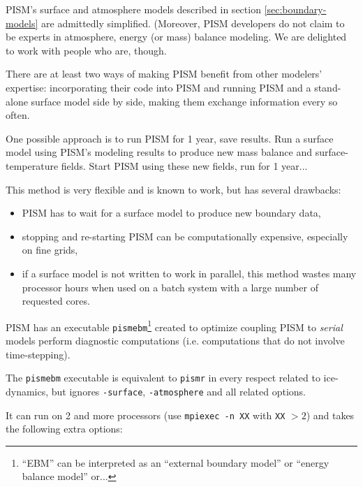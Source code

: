 PISM's surface and atmosphere models described in section
\ref{sec:boundary-models} are admittedly simplified. (Moreover, PISM developers
do not claim to be experts in atmosphere, energy (or mass) balance modeling. We
are delighted to work with people who are, though.

There are at least two ways of making PISM benefit from other modelers'
expertise: incorporating their code into PISM and running PISM and a
stand-alone surface model side by side, making them exchange information every
so often.

One possible approach is to run PISM for 1 year, save results. Run a surface
model using PISM's modeling results to produce new mass balance and
surface-temperature fields. Start PISM using these new fields, run for 1
year...

This method is very flexible and is known to work, but has several drawbacks:
\begin{itemize}
\item PISM has to wait for a surface model to produce new boundary data,
\item stopping and re-starting PISM can be computationally expensive,
  especially on fine grids,
\item if a surface model is not written to work in parallel, this method wastes
  many processor hours when used on a batch system with a large number of
  requested cores.
\end{itemize}

PISM has an executable \texttt{pismebm}\footnote{``EBM'' can be interpreted as
  an ``external boundary model'' or ``energy balance model'' or...} created to
optimize coupling PISM to \emph{serial} models perform diagnostic computations
(i.e. computations that do not involve time-stepping).

The \texttt{pismebm} executable is equivalent to \texttt{pismr} in every respect related
to ice-dynamics, but ignores \texttt{-surface}, \texttt{-atmosphere} and all
related options.

It can run on 2 and more processors (use \texttt{mpiexec -n XX} with
\texttt{XX} $> 2$) and takes the following extra options:

